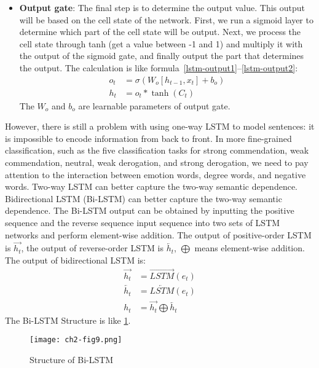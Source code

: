 \begin{itemize}
	\item \textbf{Output gate}: The final step is to determine the output value. This output will be based on the cell state of the network. First, we run a sigmoid layer to determine which part of the cell state will be output. Next, we process the cell state through tanh (get a value between -1 and 1) and multiply it with the output of the sigmoid gate, and finally output the part that determines the output. The calculation is like formula~\ref{lstm-output1}--\ref{lstm-output2}:
	      \begin{align}
		      o_{t} & =\sigma(W_{o}[h_{t-1}, x_{t}]+b_{o}) \label{lstm-output1} \\
		      h_{t} & =o_{t} * \tanh (C_{t}) \label{lstm-output2}
	      \end{align}
	      The \(W_o\) and \(b_o\) are learnable parameters of output gate.
\end{itemize}

However, there is still a problem with using one-way LSTM to model sentences: it is impossible to encode information from back to front. In more fine-grained classification, such as the five classification tasks for strong commendation, weak commendation, neutral, weak derogation, and strong derogation, we need to pay attention to the interaction between emotion words, degree words, and negative words. Two-way LSTM can better capture the two-way semantic dependence. Bidirectional LSTM (Bi-LSTM) can better capture the two-way semantic dependence. The Bi-LSTM output can be obtained by inputting the positive sequence and the reverse sequence input sequence into two sets of LSTM networks and perform element-wise addition. The output of positive-order LSTM is \(\overrightarrow{h_t}\), the output of reverse-order LSTM is \(\overleftarrow{h_t}\), \(\bigoplus \) means element-wise addition. The output of bidirectional LSTM is:
\begin{align}
	\overrightarrow{h_t} & = \overrightarrow{LSTM}(e_t)                       \\
	\overleftarrow{h_t}  & = \overleftarrow{LSTM}(e_t)                        \\
	h_t                  & =\overrightarrow{h_t}\bigoplus \overleftarrow{h_t}
\end{align}
The Bi-LSTM Structure is like \figurename{\ref{ch2-fig9}}.

\begin{figure}[htbp!]
	\centering
	\texttt{[image: ch2-fig9.png]}
	\caption{Structure of Bi-LSTM}\label{ch2-fig9}
\end{figure}

